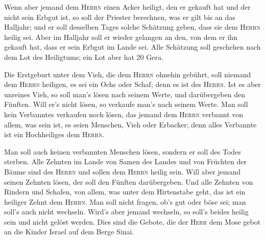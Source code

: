  Wenn aber jemand dem \textsc{Herrn} einen Acker heiligt,
den er gekauft hat und der nicht sein Erbgut ist,  so
soll der Priester berechnen, was er gilt bis an das Halljahr; und er
soll desselben Tages solche Schätzung geben, dass sie dem \textsc{Herrn}
heilig sei.  Aber im Halljahr soll er wieder gelangen an
den, von dem er ihn gekauft hat, dass er sein Erbgut im Lande sei.
 Alle Schätzung soll geschehen nach dem Lot des
Heiligtums; ein Lot aber hat 20 Gera.

 Die Erstgeburt unter dem Vieh, die dem \textsc{Herrn}
ohnehin gebührt, soll niemand dem \textsc{Herrn} heiligen, es sei ein
Ochs oder Schaf; denn es ist des \textsc{Herrn}.  Ist es
aber unreines Vieh, so soll man's lösen nach seinem Werte, und
darübergeben den Fünften. Will er's nicht lösen, so verkaufe man's nach
seinem Werte.  Man soll kein Verbanntes verkaufen noch
lösen, das jemand dem \textsc{Herrn} verbannt von allem, was sein ist,
es seien Menschen, Vieh oder Erbacker; denn alles Verbannte ist ein
Hochheiliges dem \textsc{Herrn}.

 Man soll auch keinen verbannten Menschen lösen, sondern
er soll des Todes sterben.  Alle Zehnten im Lande von
Samen des Landes und von Früchten der Bäume sind des \textsc{Herrn} und
sollen dem \textsc{Herrn} heilig sein.  Will aber jemand
seinen Zehnten lösen, der soll den Fünften darübergeben. 
Und alle Zehnten von Rindern und Schafen, von allem, was unter dem
Hirtenstabe geht, das ist ein heiliger Zehnt dem \textsc{Herrn}.
 Man soll nicht fragen, ob's gut oder böse sei; man
soll's auch nicht wechseln. Wird's aber jemand wechseln, so soll's
beides heilig sein und nicht gelöst werden.  Dies sind
die Gebote, die der \textsc{Herr} dem Mose gebot an die Kinder Israel
auf dem Berge Sinai.

